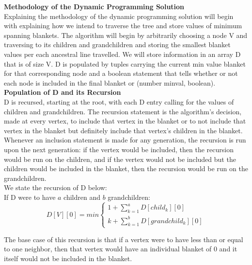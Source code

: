 \documentclass[11pt, solution, letterpaper]{format}
\begin{document}
\textbf{Methodology of the Dynamic Programming Solution}\\
Explaining the methodology of the dynamic programming solution will begin with explaining how we intend to traverse the tree and store values of minimum spanning blankets. The algorithm will begin by arbitrarily choosing a node V and traversing to its children and grandchildren and storing the smallest blanket values per each ancestral line travelled. We will store information in an array D that is of size V. D is populated by tuples carrying the current min value blanket for that corresponding node and a boolean statement that tells whether or not each node is included in the final blanket or (number minval, boolean).\\

\textbf{Population of D and its Recursion}\\
D is recursed, starting at the root, with each D entry calling for the values of children and grandchildren. The recursion statement is the algorithm's decision, made at every vertex, to include that vertex in the blanket or to not include that vertex in the blanket but definitely include that vertex's children in the blanket. Whenever an inclusion statement is made for any generation, the recursion is run upon the next generation: if the vertex would be included, then the recursion would be run on the children, and if the vertex would not be included but the children would be included in the blanket, then the recursion would be run on the grandchildren. \\

We state the recursion of D below:\\

If D were to have $a$ children and $b$ grandchildren:
 \[
  D[V][0] = min 
  \begin{cases}
                                   1 + \sum_{k=1}^{a} D[child_k][0] \\
                    k + \sum_{k=1}^{b} D[grandchild_k][0] 
                               
  \end{cases}
\]


The base case of this recursion is that if a vertex were to have less than or equal to one neighbor, then that vertex would have an individual blanket of 0 and it itself would not be included in the blanket.   \\
\end{document}
